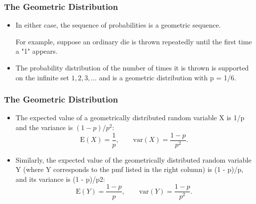 \documentclass[12pt]{beamer}
\begin{document}
\begin{frame}
\frametitle{The Geometric Distribution}
\Large
\begin{itemize}
\item
In either case, the sequence of probabilities is a geometric sequence.

\itemm For example, suppose an ordinary die is thrown repeatedly until the first time a "1" appears. 
\item The probability distribution of the number of times it is thrown is supported on the infinite set ${ 1, 2, 3, \ldots }$ and is a geometric distribution with p = 1/6.
\end{itemize}
\end{frame}
\begin{frame}
\frametitle{The Geometric Distribution}
\Large
\begin{itemize}
\item

The expected value of a geometrically distributed random variable X is 1/p and the variance is $(1 - p)/p^2$:
\[ \mathrm{E}(X) = \frac{1}{p}, \qquad\mathrm{var}(X) = \frac{1-p}{p^2}. \]
\item Similarly, the expected value of the geometrically distributed random variable Y (where Y corresponds to the pmf listed in the right column) is (1 - p)/p, 
and its variance is (1 - p)/p2:
\[ \mathrm{E}(Y) = \frac{1-p}{p}, \qquad\mathrm{var}(Y) = \frac{1-p}{p^2}.\]

\end{itemize}
\end{frame}
\end{document}
